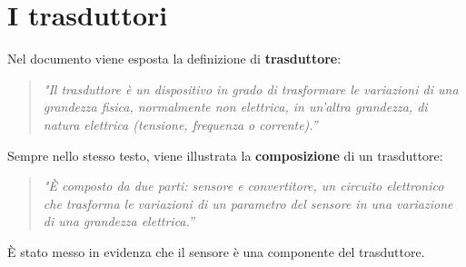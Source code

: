 \documentclass[a4paper]{report} %
\begin{document}

\section{I trasduttori}
Nel documento \cite{art:rif.11} viene esposta la definizione di \textbf{trasduttore}:
\begin{quote}
	\textit{"Il trasduttore è un dispositivo in grado di trasformare le variazioni di una grandezza fisica, normalmente non elettrica, in un'altra grandezza, di natura elettrica (tensione, frequenza o corrente).''}
\end{quote}
Sempre nello stesso testo, viene illustrata la \textbf{composizione} di un trasduttore:
\begin{quote}
	\textit{"È composto da due parti: sensore e convertitore, un circuito elettronico che trasforma le variazioni di un parametro del sensore in una variazione di una grandezza elettrica.''} 
\end{quote}
È stato messo in evidenza che il sensore è una componente del trasduttore.
\end{document}
